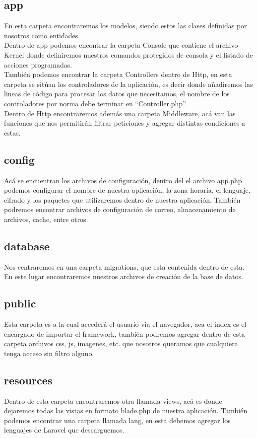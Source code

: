 \documentclass[spanish]{theme/pclreport}
\begin{document}
\subsection{app}
En esta carpeta encontraremos los modelos, siendo estos las clases definidas por nosotros como entidades. \\
Dentro de app podemos encontrar la carpeta Console que contiene el archivo Kernel donde definiremos nuestros comandos protegidos de consola y el listado de acciones programadas.\\
También podemos encontrar la carpeta Controllers dentro de Http, en esta carpeta se sitúan los controladores de la aplicación, es decir donde añadiremos las lineas de código para procesar los datos que necesitamos, el nombre de los controladores por norma debe terminar en ``Controller.php''. \\ Dentro de Http encontraremos además una carpeta Middleware, acá van las funciones que nos permitirán filtrar peticiones y agregar distintas condiciones a estas. \\

\subsection{config}
Acá se encuentran los archivos de configuración, dentro del el archivo app.php podemos configurar el nombre de nuestra aplicación, la zona horaria, el lenguaje, cifrado y los paquetes que utilizaremos dentro de nuestra aplicación. También podremos encontrar archivos de configuración de correo, almacenamiento de archivos, cache, entre otros.

\subsection{database}
Nos centraremos en una carpeta migrations, que esta contenida dentro de esta. En este lugar encontraremos nuestros archivos de creación de la base de datos.

\subsection{public}
Esta carpeta es a la cual accederá el usuario via el navegador, aca el index es el encargado de importar el framework, también podremos agregar dentro de esta carpeta archivos css, js, imagenes, etc. que nosotros queramos que cualquiera tenga acceso sin filtro alguno.

\subsection{resources}
Dentro de esta carpeta encontraremos otra llamada views, acá es donde dejaremos todas las vistas en formato blade.php de nuestra aplicación. También podemos encontrar una carpeta llamada lang, en esta debemos agregar los lenguajes de Laravel que descarguemos.
\end{document}
